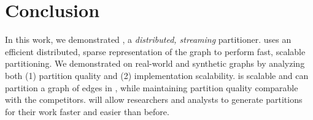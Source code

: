 \section{Conclusion}
In this work, we demonstrated \ourmethod, a \emph{distributed, streaming} partitioner.
\ourmethod uses an efficient distributed, sparse representation of the graph to perform fast, scalable partitioning.
We demonstrated \ourmethod on real-world and synthetic graphs by analyzing both (1) partition quality and (2) implementation scalability.
\ourmethod is scalable and can partition a graph of \largestgraphedges edges in \largestgraphtime, while maintaining partition quality comparable with the competitors.
\ourmethod will allow researchers and analysts to generate partitions for their work faster and easier than before.


